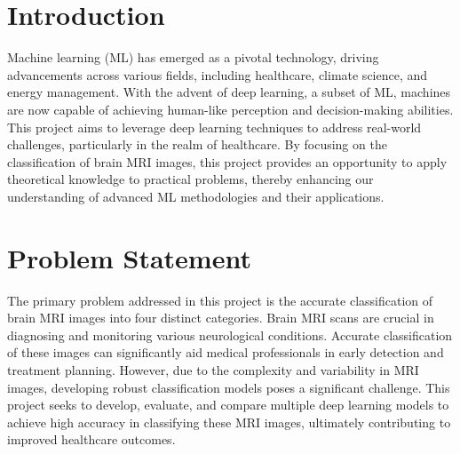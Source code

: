 \section{Introduction}\label{s:introduction}
Machine learning (ML) has emerged as a pivotal technology, driving advancements across various fields, including healthcare, climate science, and energy management. With the advent of deep learning, a subset of ML, machines are now capable of achieving human-like perception and decision-making abilities. This project aims to leverage deep learning techniques to address real-world challenges, particularly in the realm of healthcare. By focusing on the classification of brain MRI images, this project provides an opportunity to apply theoretical knowledge to practical problems, thereby enhancing our understanding of advanced ML methodologies and their applications.

\section{Problem Statement}\label{s:problem-statement}
The primary problem addressed in this project is the accurate classification of brain MRI images into four distinct categories. Brain MRI scans are crucial in diagnosing and monitoring various neurological conditions. Accurate classification of these images can significantly aid medical professionals in early detection and treatment planning. However, due to the complexity and variability in MRI images, developing robust classification models poses a significant challenge. This project seeks to develop, evaluate, and compare multiple deep learning models to achieve high accuracy in classifying these MRI images, ultimately contributing to improved healthcare outcomes.

